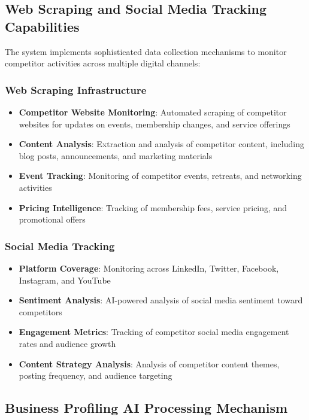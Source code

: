 \subsection{Web Scraping and Social Media Tracking Capabilities}

The system implements sophisticated data collection mechanisms to monitor competitor activities across multiple digital channels:

\subsubsection{Web Scraping Infrastructure}
\begin{itemize}
    \item \textbf{Competitor Website Monitoring}: Automated scraping of competitor websites for updates on events, membership changes, and service offerings
    \item \textbf{Content Analysis}: Extraction and analysis of competitor content, including blog posts, announcements, and marketing materials
    \item \textbf{Event Tracking}: Monitoring of competitor events, retreats, and networking activities
    \item \textbf{Pricing Intelligence}: Tracking of membership fees, service pricing, and promotional offers
\end{itemize}

\subsubsection{Social Media Tracking}
\begin{itemize}
    \item \textbf{Platform Coverage}: Monitoring across LinkedIn, Twitter, Facebook, Instagram, and YouTube
    \item \textbf{Sentiment Analysis}: AI-powered analysis of social media sentiment toward competitors
    \item \textbf{Engagement Metrics}: Tracking of competitor social media engagement rates and audience growth
    \item \textbf{Content Strategy Analysis}: Analysis of competitor content themes, posting frequency, and audience targeting
\end{itemize}

\subsection{Business Profiling AI Processing Mechanism}

